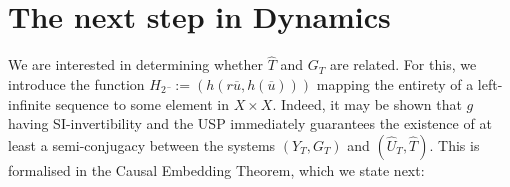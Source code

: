 \documentclass[a4paper,12pt,twoside]{report}
\begin{document}


\section{The next step in Dynamics}





We are interested in determining whether $\widehat{T}$ and $G_T$ are related. For this, we introduce  the function $H_2{\overline{}} := (h(r\overline{u}, h(\overline{u})))$ mapping the entirety of a left-infinite sequence to some element in $X\times{X}$. 
Indeed, it may be shown that $g$ having SI-invertibility and the USP immediately guarantees the existence of at least a semi-conjugacy between the systems $(Y_T, G_T)$ and $(\widehat{U}_T, \widehat{T})$.
This is formalised in the Causal Embedding Theorem, which we state next:
\end{document}
